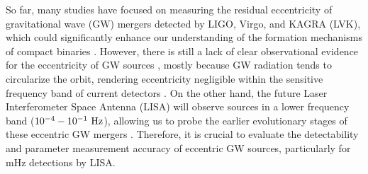 \documentclass[%
 reprint,
 amsmath,amssymb,
 aps,
]{revtex4-2}
\begin{document}
So far, many studies have focused on measuring the residual eccentricity of gravitational wave (GW) mergers detected by LIGO, Virgo, and KAGRA (LVK), which could significantly enhance our understanding of the formation mechanisms of compact binaries \citep[][]{east13, samsing14, Coughlin_2015, Gondan_2018a, Gondan_2018b, moore19,2021ApJ...913L...7A, 2021arXiv211103634T,Zevin_2021,Lower18, Romero_Shaw_2019,Knee2022ecc}. However, there is still a lack of clear 
observational evidence for the eccentricity of GW sources \citep[see, e.g.,][]{Abbott_2019ecc,Lenon_2020, Romero-Shaw_2020,gayathri2022eccentricity,Samsing+2022}, mostly because GW radiation tends to circularize the orbit, rendering eccentricity negligible within the sensitive frequency band of current detectors \citep{Peters64,Hiner08}. On the other hand, the future Laser Interferometer Space Antenna (LISA) \citep{2017arXiv170200786A} will observe sources in a lower frequency band ($10^{-4}-10^{-1}~\rm Hz$), allowing us to probe the earlier evolutionary stages of these eccentric GW mergers \citep[see, e.g., ][]{barack04,mikoczi2012,robson18, chen19, Hoang+19, Fang19, tamanini19, Torres-Orjuela21, amaro+22,Xuan+21, Xuan23acc}. Therefore, it is crucial to evaluate the detectability and parameter measurement accuracy of eccentric GW sources, particularly for mHz detections by LISA.
\end{document}
